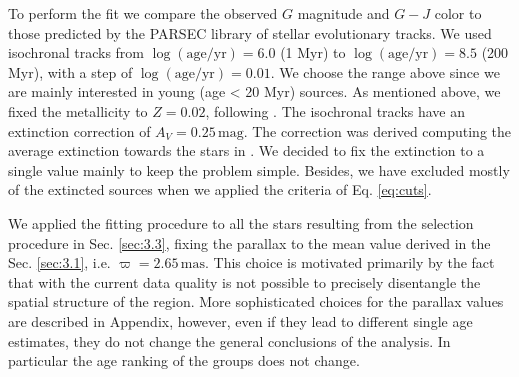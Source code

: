 \documentclass[twocolumn]{aa}
\begin{document}
\noindent 
To perform the fit we compare the observed $G$ magnitude and $G-J$ color to those predicted by the PARSEC \citep[PAdova and TRieste Stellar Evolution Code][]{Bressan2012, Chen2014, Tang2014}  library of stellar evolutionary tracks. We used isochronal tracks from $\mathrm{\log(age/yr) = 6.0}$ (1 Myr) to $\mathrm{\log(age/yr) = 8.5}$ (200 Myr), with a step of $\mathrm{\log(age/yr) = 0.01}$. We choose the range above since we are mainly interested in young (age < 20 Myr) sources. As mentioned above,  we fixed the metallicity to $Z = 0.02$, following \cite{Brown1994}. 
The isochronal tracks have an extinction correction of $A_V = 0.25 \, \mathrm{mag}$. The correction was derived computing the average  extinction towards the stars in \cite{Brown1994}.
We decided to fix the extinction to a single value mainly to keep the problem simple. Besides, we have excluded mostly of the extincted sources when we applied the criteria of Eq. \ref{eq:cuts}.
  
\noindent
We applied the fitting procedure to all the stars resulting from the selection procedure in Sec. \ref{sec:3.3}, fixing the parallax to the mean value derived in the Sec. \ref{sec:3.1}, i.e. $\varpi = 2.65 \, \mathrm{mas}$. This choice is motivated primarily by the fact that with the current data quality is not possible to precisely disentangle the spatial structure of the region. More sophisticated choices for the parallax values are described in Appendix, however, even if they lead to different single age estimates, they do not change the general conclusions of the analysis. In particular the age ranking of the groups does not change.
 
\end{document}
